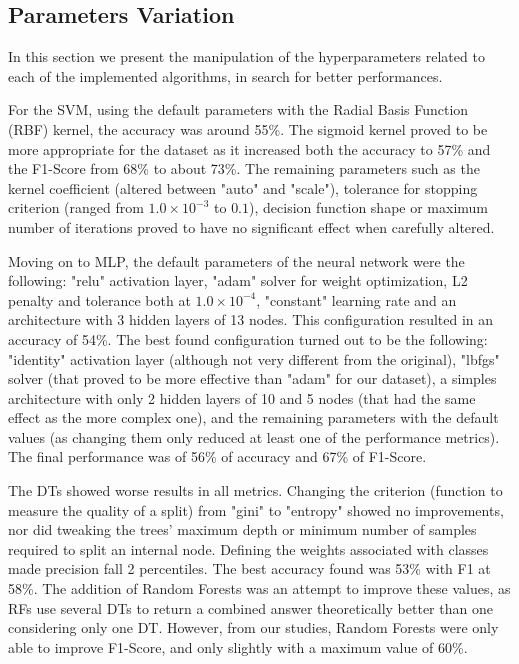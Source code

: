 \documentclass[conference]{IEEEtran}
\begin{document}
\subsection{Parameters Variation}

In this section we present the manipulation of the hyperparameters related to 
each of the implemented algorithms, in search for better performances.

For the SVM, using the default parameters with the Radial Basis Function (RBF) 
kernel, the accuracy was around 55\%.
The sigmoid kernel proved to be more appropriate for the dataset as it increased 
both the accuracy to 57\% and the F1-Score from 68\% to about 73\%.
The remaining parameters such as the kernel coefficient (altered between "auto" 
and "scale"), tolerance for stopping criterion (ranged from $1.0 \times 10^{-3}$
to $0.1$), decision function shape or maximum number of iterations proved to 
have no significant effect when carefully altered.

Moving on to MLP, the default parameters of the neural network were the following:
"relu" activation layer, "adam" solver for weight optimization, L2 penalty and 
tolerance both at $1.0 \times 10^{-4}$, "constant" learning rate and an architecture
with 3 hidden layers of 13 nodes.
This configuration resulted in an accuracy of 54\%.
The best found configuration turned out to be the following: "identity" activation
layer (although not very different from the original), "lbfgs" solver (that 
proved to be more effective than "adam" for our dataset), a simples architecture 
with only 2 hidden layers of 10 and 5 nodes (that had the same effect as the 
more complex one), and the remaining parameters with the default values (as 
changing them only reduced at least one of the performance metrics).
The final performance was of 56\% of accuracy and 67\% of F1-Score.

The DTs showed worse results in all metrics.
Changing the criterion (function to measure the quality of a split) from "gini"
to "entropy" showed no improvements, nor did tweaking the trees' maximum depth 
or minimum number of samples required to split an internal node.
Defining the weights associated with classes made precision fall 2 percentiles.
The best accuracy found was 53\% with F1 at 58\%.
The addition of Random Forests was an attempt to improve these values, as RFs 
use several DTs to return a combined answer theoretically better than one 
considering only one DT.
However, from our studies, Random Forests were only able to improve F1-Score, 
and only slightly with a maximum value of 60\%.
\end{document}
